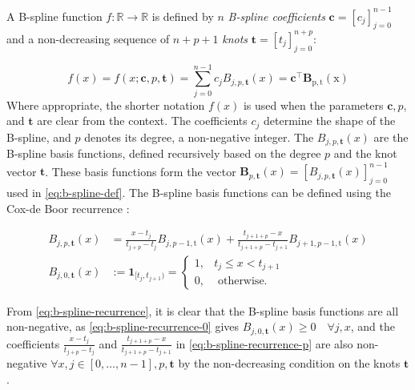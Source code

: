 A B-spline function $f: \mathbb{R} \rightarrow \mathbb{R}$ is defined by $n$ \emph{B-spline coefficients} $\mathbf{c} = [c_j]_{j=0}^{n-1}$ and a non-decreasing sequence of $n+p+1$ \emph{knots} $\mathbf{t} = [t_j]_{j=0}^{n+p}$:

\begin{equation}\label{eq:b-spline-def}
    f(x) = f(x ; \mathbf{c}, p, \mathbf{t})=\sum_{j=0}^{n-1} c_j B_{j, p, \mathbf{t}}(x)=\mathbf{c}^{\top} \mathbf{B}_{\mathrm{p}, \mathrm{t}}(\mathrm{x})
\end{equation}
Where appropriate, the shorter notation $f(x)$ is used when the parameters $\mathbf{c}, p$, and $\mathbf{t}$ are clear from the context. The coefficients $c_j$ determine the shape of the B-spline, and $p$ denotes its degree, a non-negative integer. The $B_{j, p, \mathbf{t}}(x)$ are the B-spline basis functions, defined recursively based on the degree $p$ and the knot vector $\mathbf{t}$. These basis functions form the vector $\mathbf{B}_{p, \mathbf{t}}(x) = [B_{j, p, \mathbf{t}}(x)]_{j=0}^{n-1}$ used in \cref{eq:b-spline-def}. The B-spline basis functions can be defined using the Cox-de Boor recurrence \citep{deBoor1978practicalguide}:

\begin{subequations}\label{eq:b-spline-recurrence}
    \begin{align}
        B_{j, p, \mathbf{t}}(x) & =\frac{x-t_j}{t_{j+p}-t_j} B_{j, p-1, \mathrm{t}}(x)+\frac{t_{j+1+p}-x}{t_{j+1+p}-t_{j+1}} B_{j+1, p-1, \mathrm{t}}(x) \label{eq:b-spline-recurrence-p} \\
        B_{j, 0, \mathbf{t}}(x) & := 
        \mathbf 1_{[t_j, t_{j+1})} =
        \begin{cases}
            1, & t_j \leq x<t_{j+1} \\
            0, & \text { otherwise. }
        \end{cases} \label{eq:b-spline-recurrence-0}
    \end{align}
\end{subequations}

From \cref{eq:b-spline-recurrence}, it is clear that the B-spline basis functions are all non-negative, as \cref{eq:b-spline-recurrence-0} gives $B_{j, 0, \mathbf{t}}(x) \geq 0 \quad\forall j, x$, and the coefficients $\frac{x-t_j}{t_{j+p}-t_j}$ and $\frac{t_{j+1+p}-x}{t_{j+1+p}-t_{j+1}}$
in \cref{eq:b-spline-recurrence-p} are also non-negative $\forall x, j\in[0,\dots,n-1], p, \mathbf t$ by the non-decreasing condition on the knots $\mathbf t$. 

